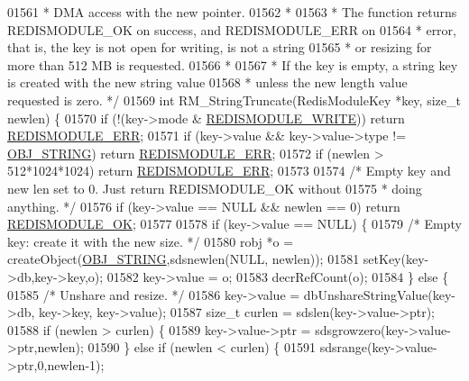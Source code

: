 \begin{DoxyCode}
{{{01561 \textcolor{comment}{ * DMA access with the new pointer.}
01562 \textcolor{comment}{ *}
01563 \textcolor{comment}{ * The function returns REDISMODULE\_OK on success, and REDISMODULE\_ERR on}
01564 \textcolor{comment}{ * error, that is, the key is not open for writing, is not a string}
01565 \textcolor{comment}{ * or resizing for more than 512 MB is requested.}
01566 \textcolor{comment}{ *}
01567 \textcolor{comment}{ * If the key is empty, a string key is created with the new string value}
01568 \textcolor{comment}{ * unless the new length value requested is zero. */}
01569 \textcolor{keywordtype}{int} RM\_StringTruncate(RedisModuleKey *key, size\_t newlen) \{
01570     \textcolor{keywordflow}{if} (!(key->mode & \hyperlink{redismodule_8h_a73b37117ef94cb4a904361afcc51b6b4}{REDISMODULE\_WRITE})) \textcolor{keywordflow}{return} 
      \hyperlink{redismodule_8h_a3df6f5bd5247289e66f44437a7cddd49}{REDISMODULE\_ERR};
01571     \textcolor{keywordflow}{if} (key->value && key->value->type != \hyperlink{server_8h_a65236ea160f69cdef33ec942092af88f}{OBJ\_STRING}) \textcolor{keywordflow}{return} 
      \hyperlink{redismodule_8h_a3df6f5bd5247289e66f44437a7cddd49}{REDISMODULE\_ERR};
01572     \textcolor{keywordflow}{if} (newlen > 512*1024*1024) \textcolor{keywordflow}{return} \hyperlink{redismodule_8h_a3df6f5bd5247289e66f44437a7cddd49}{REDISMODULE\_ERR};
01573 
01574     \textcolor{comment}{/* Empty key and new len set to 0. Just return REDISMODULE\_OK without}
01575 \textcolor{comment}{     * doing anything. */}
01576     \textcolor{keywordflow}{if} (key->value == NULL && newlen == 0) \textcolor{keywordflow}{return} \hyperlink{redismodule_8h_a1bc5bfd69abcd378ff52c640adc5418d}{REDISMODULE\_OK};
01577 
01578     \textcolor{keywordflow}{if} (key->value == NULL) \{
01579         \textcolor{comment}{/* Empty key: create it with the new size. */}
01580         robj *o = createObject(\hyperlink{server_8h_a65236ea160f69cdef33ec942092af88f}{OBJ\_STRING},sdsnewlen(NULL, newlen));
01581         setKey(key->db,key->key,o);
01582         key->value = o;
01583         decrRefCount(o);
01584     \} \textcolor{keywordflow}{else} \{
01585         \textcolor{comment}{/* Unshare and resize. */}
01586         key->value = dbUnshareStringValue(key->db, key->key, key->value);
01587         size\_t curlen = sdslen(key->value->ptr);
01588         \textcolor{keywordflow}{if} (newlen > curlen) \{
01589             key->value->ptr = sdsgrowzero(key->value->ptr,newlen);
01590         \} \textcolor{keywordflow}{else} \textcolor{keywordflow}{if} (newlen < curlen) \{
01591             sdsrange(key->value->ptr,0,newlen-1);
}}}
\end{DoxyCode}
